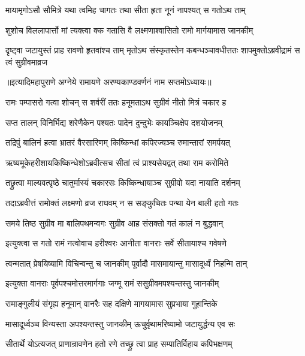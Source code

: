 \twolineshloka
{मायामृगोऽसौ सौमित्रे यथा त्वमिह चागतः }
{तथा सीता हृता नूनं नापश्यत् स गतोऽथ ताम्}%

\twolineshloka
{शुशोच विललापार्त्तो मां त्यक्त्वा क्क गतासि वै}
{लक्ष्मणाश्वासितो रामो मार्गयामास जानकीम्}%

\threelineshloka
{दृष्ट्वा जटायुस्तं प्राह रावणो हृतवांश्च ताम्}
{मृतोऽथ संस्कृतस्तेन कबन्धञ्चावधीत्ततः}
{शापमुक्तोऽब्रवीद्रामं स त्वं सुग्रीवमाव्रज} %

॥इत्यादिमहापुराणे अग्नेये रामायणे अरण्यकाण्डवर्णनं नाम सप्तमोऽध्यायः॥





\twolineshloka
{रामः पम्पासरो गत्वा शोचन् स शर्वरीं ततः}
{हनूमताऽथ सुग्रीवं नीतो मित्रं चकार ह}%

\twolineshloka
{सप्त तालन् विनिर्भिद्य शरेणैकेन पश्यतः}
{पादेन दुन्दुभेः कायञ्चिक्षेप दशयोजनम्}%

\twolineshloka
{तद्रिपुं बालिनं हत्वा भ्रातरं वैरसारिणम्}
{किष्किन्धां कपिरज्यञ्च रुमान्तारां समर्पयत्}%

\twolineshloka
{ऋष्यमूकेहरीशायकिष्किन्धेशोऽब्रवीत्सच }
{सीतां त्वं प्राश्यसेयद्वत् तथा राम करोमिते}%

\twolineshloka
{तछ्रुत्वा माल्यवत्पृष्ठे चातुर्मास्यं चकारसः}
{किष्किन्धायाञ्च सुग्रीवो यदा नायाति दर्शनम्}%

\twolineshloka
{तदाऽब्रवीत्तं रामोक्तं लक्ष्मणो व्रज राघवम्}
{न स सङ्कुचितः पन्था येन बाली हतो गतः}%

\twolineshloka
{समये तिष्ठ सुग्रीव मा बालिपथमन्वगः}
{सुग्रीव आह संसक्तो गतं कालं न बुद्धवान्}%

\twolineshloka
{इत्युक्त्वा स गतो रामं नत्वोवाच हरीश्वरः}
{आनीता वानराः सर्वे सीतायाश्च गवेषणे}%

\twolineshloka
{त्वन्मतात् प्रेषयिष्यामि विचिन्वन्तु च जानकीम् }
{पूर्वादौ मासमायान्तु मासादूर्ध्वं निहन्मि तान्}%

\twolineshloka
{इत्युक्ता वानराः पूर्वपश्चमोत्तरमार्गगाः}
{जग्मू रामं ससुग्रीवमपश्यन्तस्तु जानकीम्}%

\twolineshloka
{रामाङ्गुलीयं संगृह्य हनूमान् वानरैः सह}
{दक्षिणे मागयामास सुप्रभाया गुहान्तिके}%

\twolineshloka
{मासादूर्ध्वञ्च विन्यस्ता अपश्यन्तस्तु जानकीम्}
{ऊचुर्वृथामरिष्यामो जटायुर्द्धन्य एव सः}%

\twolineshloka
{सीतार्थे योऽत्यजत् प्राणान्रावणेन हतो रणे}
{तच्छ्रु त्वा प्राह सम्पातिर्विहाय कपिभक्षणम्}%

